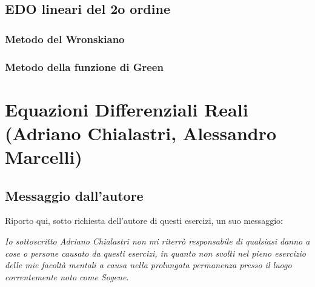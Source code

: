 \newpage

\subsection{EDO lineari del 2o ordine}

\subsubsection{Metodo del Wronskiano}


\subsubsection{Metodo della funzione di Green}


\newpage
\section{Equazioni Differenziali Reali (Adriano Chialastri, Alessandro Marcelli)}

\subsection{Messaggio dall'autore}

Riporto qui, sotto richiesta dell'autore di questi esercizi, un suo messaggio:

\textit{Io sottoscritto Adriano Chialastri non mi riterrò responsabile di qualsiasi danno a cose o persone causato da questi esercizi, in quanto non svolti nel pieno esercizio delle mie facoltà mentali a causa nella prolungata permanenza presso il luogo correntemente noto come Sogene.
}

